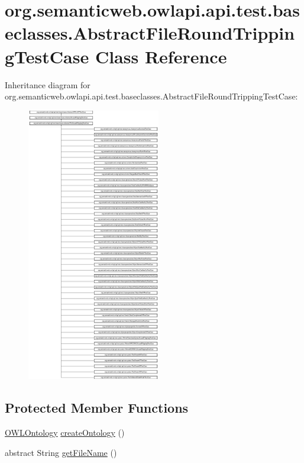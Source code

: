 \hypertarget{classorg_1_1semanticweb_1_1owlapi_1_1api_1_1test_1_1baseclasses_1_1_abstract_file_round_tripping_test_case}{\section{org.\-semanticweb.\-owlapi.\-api.\-test.\-baseclasses.\-Abstract\-File\-Round\-Tripping\-Test\-Case Class Reference}
\label{classorg_1_1semanticweb_1_1owlapi_1_1api_1_1test_1_1baseclasses_1_1_abstract_file_round_tripping_test_case}
}
Inheritance diagram for org.\-semanticweb.\-owlapi.\-api.\-test.\-baseclasses.\-Abstract\-File\-Round\-Tripping\-Test\-Case\-:\begin{figure}[H]
\begin{center}
\leavevmode
\includegraphics[height=12.000000cm]{classorg_1_1semanticweb_1_1owlapi_1_1api_1_1test_1_1baseclasses_1_1_abstract_file_round_tripping_test_case}
\end{center}
\end{figure}
\subsection*{Protected Member Functions}
\begin{DoxyCompactItemize}
\item 
\hyperlink{interfaceorg_1_1semanticweb_1_1owlapi_1_1model_1_1_o_w_l_ontology}{O\-W\-L\-Ontology} \hyperlink{classorg_1_1semanticweb_1_1owlapi_1_1api_1_1test_1_1baseclasses_1_1_abstract_file_round_tripping_test_case_a69073fe9d89b007f424056054fdc4dd6}{create\-Ontology} ()
\item 
abstract String \hyperlink{classorg_1_1semanticweb_1_1owlapi_1_1api_1_1test_1_1baseclasses_1_1_abstract_file_round_tripping_test_case_adea1fc703baeeb982e90592cb66f9480}{get\-File\-Name} ()
\end{DoxyCompactItemize}

